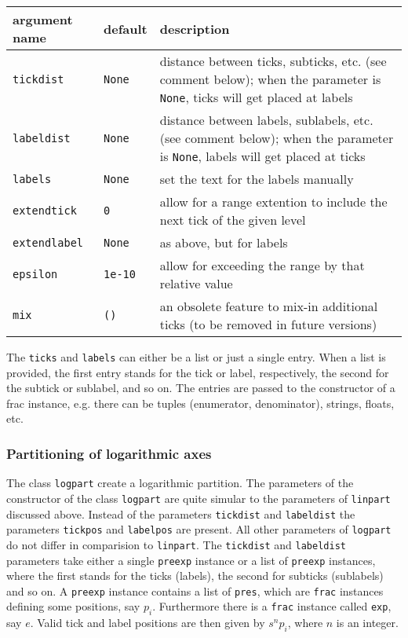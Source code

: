 \medskip
\begin{tabularx}{\linewidth}{ll>{\raggedright\arraybackslash}X}
argument name&default&description\\
\hline
\texttt{tickdist}&\texttt{None}&distance between ticks, subticks, etc. (see comment below); when the parameter is \texttt{None}, ticks will get placed at labels\\
\texttt{labeldist}&\texttt{None}&distance between labels, sublabels, etc. (see comment below); when the parameter is \texttt{None}, labels will get placed at ticks\\
\texttt{labels}&\texttt{None}&set the text for the labels manually\\
\texttt{extendtick}&\texttt{0}&allow for a range extention to include the next tick of the given level\\
\texttt{extendlabel}&\texttt{None}&as above, but for labels\\
\texttt{epsilon}&\texttt{1e-10}&allow for exceeding the range by that relative value\\
\texttt{mix}&\texttt{()}&an obsolete feature to mix-in additional ticks (to be removed in future versions)\\
\end{tabularx}
\medskip

The \verb|ticks| and \verb|labels| can either be a list or just a
single entry. When a list is provided, the first entry stands for
the tick or label, respectively, the second for the subtick or
sublabel, and so on. The entries are passed to the constructor of a
frac instance, e.g. there can be tuples (enumerator, denominator),
strings, floats, etc.

\subsubsection{Partitioning of logarithmic axes}

The class \verb|logpart| create a logarithmic partition. The
parameters of the constructor of the class \verb|logpart| are quite
simular to the parameters of \verb|linpart| discussed above. Instead
of the parameters \verb|tickdist| and \verb|labeldist| the parameters
\verb|tickpos| and \verb|labelpos| are present. All other parameters
of \verb|logpart| do not differ in comparision to \verb|linpart|. The
\verb|tickdist| and \verb|labeldist| parameters take either a single
\verb|preexp| instance or a list of \verb|preexp| instances, where the
first stands for the ticks (labels), the second for subticks
(sublabels) and so on. A \verb|preexp| instance contains a list of
\verb|pres|, which are \verb|frac| instances defining some positions,
say $p_i$. Furthermore there is a \verb|frac| instance called
\verb|exp|, say $e$. Valid tick and label positions are then given by
$s^np_i$, where $n$ is an integer.

